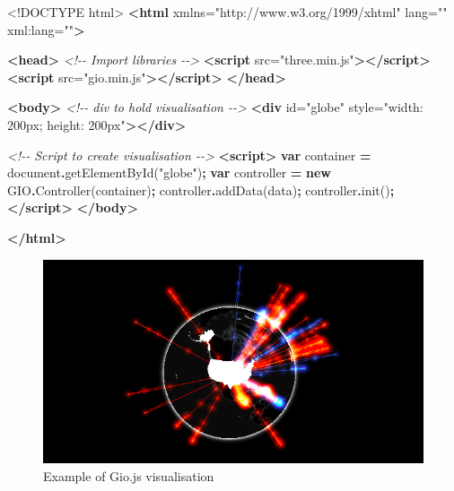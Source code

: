\documentclass[
]{krantz}
\makeatletter
\newenvironment{Shaded}{\begin{snugshade}}{\end{snugshade}}
\newcommand{\BuiltInTok}[1]{#1}
\newcommand{\CommentTok}[1]{\textcolor[rgb]{0.37,0.37,0.37}{\textit{#1}}}
\newcommand{\DataTypeTok}[1]{\textcolor[rgb]{0.27,0.27,0.27}{#1}}
\newcommand{\FunctionTok}[1]{\textcolor[rgb]{0,0,0}{#1}}
\newcommand{\KeywordTok}[1]{\textcolor[rgb]{0.27,0.27,0.27}{\textbf{#1}}}
\newcommand{\NormalTok}[1]{#1}
\newcommand{\OperatorTok}[1]{\textcolor[rgb]{0.43,0.43,0.43}{\textbf{#1}}}
\newcommand{\OtherTok}[1]{\textcolor[rgb]{0.37,0.37,0.37}{#1}}
\newcommand{\StringTok}[1]{\textcolor[rgb]{0.5,0.5,0.5}{#1}}
\newenvironment{kframe}{%
\medskip{}
\setlength{\fboxsep}{.8em}
 \def\at@end@of@kframe{}%
 \ifinner\ifhmode%
  \def\at@end@of@kframe{\end{minipage}}%
  \begin{minipage}{\columnwidth}%
 \fi\fi%
 \def\FrameCommand##1{\hskip\@totalleftmargin \hskip-\fboxsep
 \colorbox{shadecolor}{##1}\hskip-\fboxsep
     \hskip-\linewidth \hskip-\@totalleftmargin \hskip\columnwidth}%
 \MakeFramed {\advance\hsize-\width
   \@totalleftmargin\z@ \linewidth\hsize
   \@setminipage}}%
 {\par\unskip\endMakeFramed%
 \at@end@of@kframe}
\renewenvironment{Shaded}{\begin{kframe}}{\end{kframe}}
\makeatother
\begin{document}
\begin{Shaded}
\begin{Highlighting}[]
\DataTypeTok{\textless{}!DOCTYPE }\NormalTok{html}\DataTypeTok{\textgreater{}}
\KeywordTok{\textless{}html}\OtherTok{ xmlns=}\StringTok{"http://www.w3.org/1999/xhtml"}\OtherTok{ lang=}\StringTok{""}\OtherTok{ xml:lang=}\StringTok{""}\KeywordTok{\textgreater{}}

\KeywordTok{\textless{}head\textgreater{}}
  \CommentTok{\textless{}!{-}{-} Import libraries {-}{-}\textgreater{}}
  \KeywordTok{\textless{}script}\OtherTok{ src=}\StringTok{"three.min.js"}\KeywordTok{\textgreater{}\textless{}/script\textgreater{}}
  \KeywordTok{\textless{}script}\OtherTok{ src=}\StringTok{"gio.min.js"}\KeywordTok{\textgreater{}\textless{}/script\textgreater{}}
\KeywordTok{\textless{}/head\textgreater{}}

\KeywordTok{\textless{}body\textgreater{}}
  \CommentTok{\textless{}!{-}{-} div to hold visualisation {-}{-}\textgreater{}}
  \KeywordTok{\textless{}div}\OtherTok{ id=}\StringTok{"globe"}\OtherTok{ style=}\StringTok{"width: 200px; height: 200px"}\KeywordTok{\textgreater{}\textless{}/div\textgreater{}}

  \CommentTok{\textless{}!{-}{-} Script to create visualisation {-}{-}\textgreater{}}
  \KeywordTok{\textless{}script\textgreater{}}
    \KeywordTok{var}\NormalTok{ container }\OperatorTok{=} \BuiltInTok{document}\OperatorTok{.}\FunctionTok{getElementById}\NormalTok{(}\StringTok{"globe"}\NormalTok{)}\OperatorTok{;}
    \KeywordTok{var}\NormalTok{ controller }\OperatorTok{=} \KeywordTok{new}\NormalTok{ GIO}\OperatorTok{.}\FunctionTok{Controller}\NormalTok{(container)}\OperatorTok{;}
\NormalTok{    controller}\OperatorTok{.}\FunctionTok{addData}\NormalTok{(data)}\OperatorTok{;}
\NormalTok{    controller}\OperatorTok{.}\FunctionTok{init}\NormalTok{()}\OperatorTok{;}
  \KeywordTok{\textless{}/script\textgreater{}}
\KeywordTok{\textless{}/body\textgreater{}}

\KeywordTok{\textless{}/html\textgreater{}}
\end{Highlighting}
\end{Shaded}

\begin{figure}
\centering
\includegraphics{images/gio-example.png}
\caption{Example of Gio.js visualisation}
\end{figure}
\end{document}
